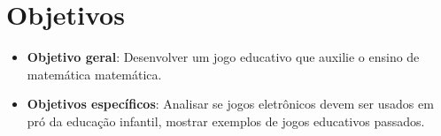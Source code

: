 \section{Objetivos}
\label{objetivos}


\begin{itemize}
		\item \textbf{Objetivo geral}: Desenvolver um jogo educativo que auxilie o ensino de matemática matemática. 
		
		\item \textbf{Objetivos específicos}: Analisar se jogos eletrônicos devem ser usados em pró da educação infantil, mostrar exemplos de jogos educativos passados.
\end{itemize}

